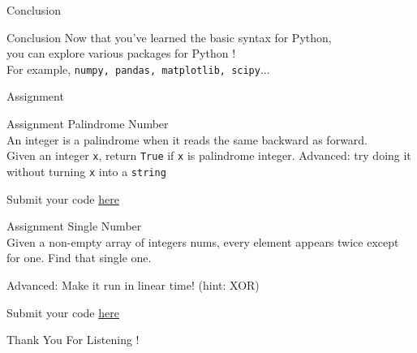 \documentclass{beamer}
\begin{document}
    \begin{frame}[plain, c]
        \begin{center}
            \color{blue} \LARGE Conclusion
        \end{center}
    \end{frame}
    
    \begin{frame}{Conclusion}
        Now that you've learned the basic syntax for Python, \\
        you can explore various packages for Python ! \\
        For example, \texttt{numpy, pandas, matplotlib, scipy}... \\
        
    \end{frame}

    \begin{frame}[plain, c]
        \begin{center}
            \color{blue} \LARGE Assignment
        \end{center}
    \end{frame}

    \begin{frame}[fragile]{Assignment}
        \color{blue} \Large Palindrome Number  \\
        \color{black} \normalsize \vskip 10pt
        An integer is a palindrome when it reads the same backward as forward. \\
        Given an integer \texttt{x}, return \texttt{True} if \texttt{x} is palindrome integer. \vskip 10pt
        Advanced: try doing it without turning \texttt{x} into a \texttt{string} \vskip 10pt

        Submit your code \href{https://leetcode.com/problems/palindrome-number/}{here}
    \end{frame}

    \begin{frame}[fragile]{Assignment}
        \color{blue} \Large Single Number  \\
        \color{black} \normalsize \vskip 10pt
        Given a non-empty array of integers nums, 
        every element appears twice except for one. Find that single one. \vskip 10pt

        Advanced: Make it run in linear time! (hint: XOR) \vskip 10pt 

        Submit your code \href{https://leetcode.com/problems/single-number/}{here}
    \end{frame}
    
    \begin{frame}[plain, c]
        \begin{center}
            \color{blue} \LARGE Thank You For Listening !
        \end{center}
    \end{frame}
\end{document}
